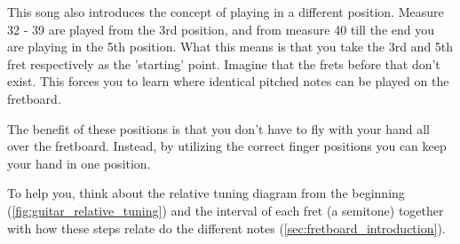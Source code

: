 This song also introduces the concept of playing in a different position. Measure 32 - 39 are played from the 3rd position, and from measure 40 till the end you are playing in the 5th position. What this means is that you take the 3rd and 5th fret respectively as the 'starting' point. Imagine that the frets before that don't exist. This forces you to learn where identical pitched notes can be played on the fretboard.

The benefit of these positions is that you don't have to fly with your hand all over the fretboard. Instead, by utilizing the correct finger positions you can keep your hand in one position.

To help you, think about the relative tuning diagram from the beginning (\autoref{fig:guitar_relative_tuning}) and the interval of each fret (a semitone) together with how these steps relate do the different notes (\autoref{sec:fretboard_introduction}). 




